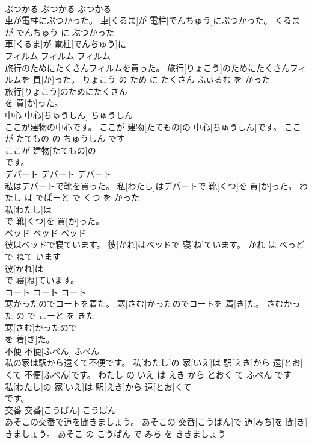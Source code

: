 \documentclass[8pt]{extreport}
\begin{document}
\begin{CJK}{UTF8}{min}
\\	ぶつかる	ぶつかる	ぶつかる	
\\	車が電柱にぶつかった。	車[くるま]が 電柱[でんちゅう]にぶつかった。	くるま が でんちゅう に ぶつかった	
\\	車[くるま]が 電柱[でんちゅう]に
\\	フィルム	フィルム	フィルム	
\\	旅行のためにたくさんフィルムを買った。	旅行[りょこう]のためにたくさんフィルムを 買[か]った。	りょこう の ため に たくさん ふぃるむ を かった	
\\	旅行[りょこう]のためにたくさん
\\	を 買[か]った。			
\\	中心	中心[ちゅうしん]	ちゅうしん	
\\	ここが建物の中心です。	ここが 建物[たてもの]の 中心[ちゅうしん]です。	ここ が たてもの の ちゅうしん です	
\\	ここが 建物[たてもの]の
\\	です。			
\\	デパート	デパート	デパート	
\\	私はデパートで靴を買った。	私[わたし]はデパートで 靴[くつ]を 買[か]った。	わたし は でぱーと で くつ を かった	
\\	私[わたし]は
\\	で 靴[くつ]を 買[か]った。			
\\	ベッド	ベッド	ベッド	
\\	彼はベッドで寝ています。	彼[かれ]はベッドで 寝[ね]ています。	かれ は べっど で ねて います	
\\	彼[かれ]は
\\	で 寝[ね]ています。			
\\	コート	コート	コート	
\\	寒かったのでコートを着た。	寒[さむ]かったのでコートを 着[き]た。	さむかった の で こーと を きた	
\\	寒[さむ]かったので
\\	を 着[き]た。			
\\	不便	不便[ふべん]	ふべん	
\\	私の家は駅から遠くて不便です。	私[わたし]の 家[いえ]は 駅[えき]から 遠[とお]くて 不便[ふべん]です。	わたし の いえ は えき から とおく て ふべん です	
\\	私[わたし]の 家[いえ]は 駅[えき]から 遠[とお]くて
\\	です。			
\\	交番	交番[こうばん]	こうばん	
\\	あそこの交番で道を聞きましょう。	あそこの 交番[こうばん]で 道[みち]を 聞[き]きましょう。	あそこ の こうばん で みち を ききましょう	

\end{CJK}
\end{document}
